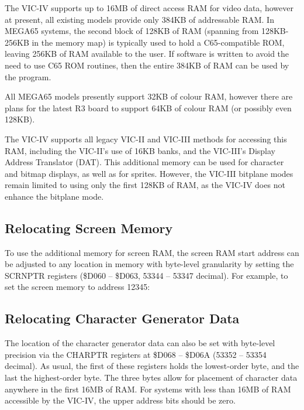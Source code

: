 The VIC-IV supports up to 16MB of direct access RAM for video data, however at present, all existing models provide only 384KB of addressable RAM.
In MEGA65 systems, the second block of 128KB of RAM (spanning from 128KB-256KB in the memory map) is typically used to hold a C65-compatible ROM,
leaving 256KB of RAM available to the user. If software is written to avoid the need to use C65 ROM routines, then the entire 384KB of RAM can be used by the program.

All MEGA65 models presently support 32KB of colour RAM, however there are plans for the latest R3 board to support 64KB of colour RAM (or possibly even 128KB).

The VIC-IV supports all legacy VIC-II and VIC-III methods for accessing this RAM, including the VIC-II's use of 16KB banks, and the VIC-III's Display Address Translator (DAT).  This additional memory can be used for character and bitmap displays, as well as for sprites.  However, the VIC-III bitplane modes remain limited to using only the first 128KB of RAM, as the VIC-IV does not enhance the bitplane mode.

\subsection{Relocating Screen Memory}

To use the additional memory for screen RAM, the screen RAM start address can be adjusted to any location in memory with byte-level granularity by setting the SCRNPTR registers (\$D060 -- \$D063, 53344 -- 53347 decimal).  For example, to set the screen memory to address 12345:


\subsection{Relocating Character Generator Data}

The location of the character generator data can also be set with byte-level precision via the CHARPTR registers at \$D068 -- \$D06A (53352 -- 53354 decimal). As usual, the first of these registers holds the lowest-order byte, and the last the highest-order byte. The three bytes allow for placement of character data anywhere in the first 16MB of RAM. For systems with less than 16MB of RAM accessible by the VIC-IV, the upper address bits should be zero.

